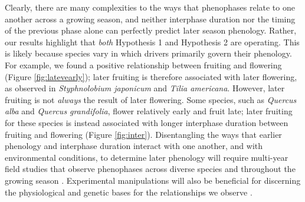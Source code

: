\documentclass{article}
\begin{document}
\par Clearly, there are many complexities to the ways that phenophases relate to one another across a growing season, and neither interphase duration nor the timing of the previous phase alone can perfectly predict later season phenology. Rather, our results highlight that \textit{both} Hypothesis 1 and Hypothesis 2 are operating. This is likely because species vary in which drivers primarily govern their phenology. For example, we found a positive relationship between fruiting and flowering (Figure \ref{fig:latevearly}); later fruiting is therefore associated with later flowering, as observed in \textit{Styphnolobium japonicum} and \textit{Tilia americana}. However, later fruiting is not \textit{always} the result of later flowering. Some species, such as \textit{Quercus alba} and \textit{Quercus grandifolia}, flower relatively early and fruit late; later fruiting for these species is instead associated with longer interphase duration between fruiting and flowering (Figure \ref{fig:inter}). Disentangling the ways that earlier phenology and interphase duration interact with one another, and with environmental conditions, to determine later phenology will require multi-year field studies that observe phenophases across diverse species and throughout the growing season \citep[e.g.,][]{elmendorf2016}. Experimental manipulations will also be beneficial for discerning the physiological and genetic bases for the relationships we observe \citep{flint1974}.
\end{document}
